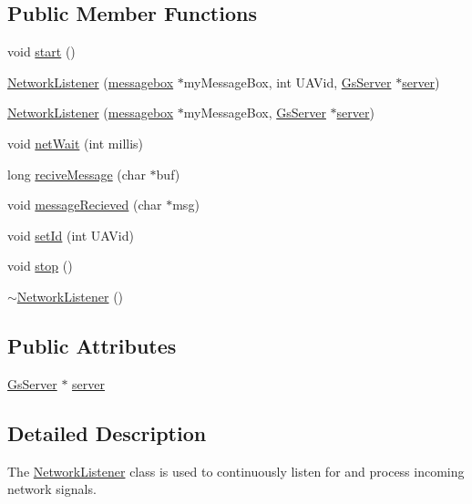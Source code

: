 \subsection*{Public Member Functions}
\begin{DoxyCompactItemize}
\item 
void \hyperlink{class_network_listener_aae655a7afbd74bbe193612f2b7638958}{start} ()
\item 
\hyperlink{class_network_listener_a47d3f9cbc646f4accac24d9e9e7669cc}{Network\+Listener} (\hyperlink{classmessagebox}{messagebox} $\ast$my\+Message\+Box, int U\+A\+Vid, \hyperlink{class_gs_server}{Gs\+Server} $\ast$\hyperlink{class_network_listener_a18b48fbd5b2df44baa73e4b332981a56}{server})
\item 
\hyperlink{class_network_listener_a12b670b3b9a0f89900ab423e5a31ba54}{Network\+Listener} (\hyperlink{classmessagebox}{messagebox} $\ast$my\+Message\+Box, \hyperlink{class_gs_server}{Gs\+Server} $\ast$\hyperlink{class_network_listener_a18b48fbd5b2df44baa73e4b332981a56}{server})
\item 
void \hyperlink{class_network_listener_abffa3dbc0d6b31e53a638655f7efa9ee}{net\+Wait} (int millis)
\item 
long \hyperlink{class_network_listener_a12862b1a35cb8ba6c2ac8c7f1df9b1bf}{recive\+Message} (char $\ast$buf)
\item 
void \hyperlink{class_network_listener_a3174e591844d73c16e559804fa3a4ac6}{message\+Recieved} (char $\ast$msg)
\item 
void \hyperlink{class_network_listener_ab1dda7d270a90847a1537d04009c912b}{set\+Id} (int U\+A\+Vid)
\item 
void \hyperlink{class_network_listener_a258e0ef8e6e4de827e652a43186c6a07}{stop} ()
\item 
\hyperlink{class_network_listener_a18ad1d8973011f8bdceb5fc6d5cd81c1}{$\sim$\+Network\+Listener} ()
\end{DoxyCompactItemize}
\subsection*{Public Attributes}
\begin{DoxyCompactItemize}
\item 
\hyperlink{class_gs_server}{Gs\+Server} $\ast$ \hyperlink{class_network_listener_a18b48fbd5b2df44baa73e4b332981a56}{server}
\end{DoxyCompactItemize}


\subsection{Detailed Description}
The \hyperlink{class_network_listener}{Network\+Listener} class is used to continuously listen for and process incoming network signals. 

